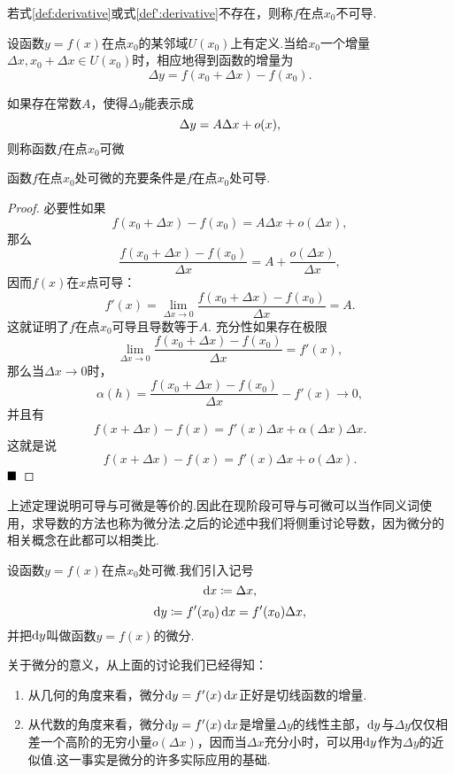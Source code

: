 若式\ref{def:derivative}或式\ref{def':derivative}不存在，则称$f${\heiti 在点$x_0$不可导}.
\begin{definition}[可微]
	设函数$y=f(x)$在点$x_0$的某邻域$U(x_0)$上有定义.当给$x_0$一个增量$\Delta x,x_0+\Delta x\in U(x_0)$时，相应地得到函数的增量为
	$$\Delta y=f(x_0+\Delta x)-f(x_0).$$
	
	如果存在常数$A$，使得$\Delta y$能表示成
	\begin{equation}{\label{def:differential}}
		\Delta y=A\Delta x+o(x),
	\end{equation}
	则称函数$f$在点$x_0${\heiti 可微}
\end{definition}
\begin{theorem}
	函数$f$在点$x_0$处可微的充要条件是$f$在点$x_0$处可导.
\end{theorem}
\begin{proof}
	必要性\qquad 如果
	$$f(x_0+\Delta x)-f(x_0)=A\Delta x+o(\Delta x),$$
	那么
	$$\frac{f(x_0+\Delta x)-f(x_0)}{\Delta x}=A+\frac{o(\Delta x)}{\Delta x},$$
	因而$f(x)$在$x$点可导：
	$$f'(x)=\lim\limits_{\Delta x\to 0}\frac{f(x_0+\Delta x)-f(x_0)}{\Delta x}=A.$$
	这就证明了$f$在点$x_0$可导且导数等于$A$.
	充分性\qquad 如果存在极限
	$$\lim\limits_{\Delta x\to 0}\frac{f(x_0+\Delta x)-f(x_0)}{\Delta x}=f'(x),$$
	那么当$\Delta x\to 0$时，
	$$\alpha(h)=\frac{f(x_0+\Delta x)-f(x_0)}{\Delta x}-f'(x)\to 0,$$
	并且有
	$$f(x+\Delta x)-f(x)=f'(x)\Delta x+\alpha(\Delta x)\Delta x.$$
	这就是说
	$$f(x+\Delta x)-f(x)=f'(x)\Delta x+o(\Delta x).$$
	$\hfill\blacksquare$
\end{proof}
\begin{remark}
	上述定理说明可导与可微是等价的.因此在现阶段可导与可微可以当作同义词使用，求导数的方法也称为微分法.之后的论述中我们将侧重讨论导数，因为微分的相关概念在此都可以相类比.
\end{remark}
\begin{definition}[微分]
	设函数$y=f(x)$在点$x_0$处可微.我们引入记号
	$$\odif{x}\coloneqq \Delta x,$$
	$$\odif{y}\coloneqq f'(x_0)\odif{x}=f'(x_0)\Delta x,$$
	并把$\odif{y}$叫做函数$y=f(x)$的{\heiti 微分}.
\end{definition}
\begin{remark}
	关于微分的意义，从上面的讨论我们已经得知：
	\begin{enumerate}
		\item 从几何的角度来看，微分$\odif{y}=f'(x)\odif{x}$正好是切线函数的增量.
		\item 从代数的角度来看，微分$\odif{y}=f'(x)\odif{x}$是增量$\Delta y$的线性主部，$\odif{y}$与$\Delta y$仅仅相差一个高阶的无穷小量$o(\Delta x)$，因而当$\Delta x$充分小时，可以用$\odif{y}$作为$\Delta y$的近似值.这一事实是微分的许多实际应用的基础.
	\end{enumerate}
\end{remark}
